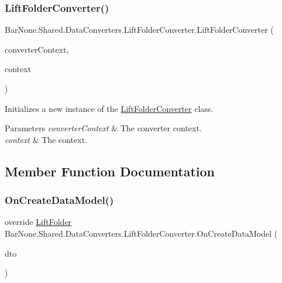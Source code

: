 \subsubsection{\texorpdfstring{Lift\+Folder\+Converter()}{LiftFolderConverter()}}
{\footnotesize\ttfamily Bar\+None.\+Shared.\+Data\+Converters.\+Lift\+Folder\+Converter.\+Lift\+Folder\+Converter (\begin{DoxyParamCaption}\item[{\mbox{\hyperlink{class_bar_none_1_1_shared_1_1_data_converters_1_1_converters}{Converters}}}]{converter\+Context,  }\item[{\mbox{\hyperlink{interface_bar_none_1_1_shared_1_1_core_1_1_i_domain_context}{I\+Domain\+Context}}}]{context }\end{DoxyParamCaption})}



Initializes a new instance of the \mbox{\hyperlink{class_bar_none_1_1_shared_1_1_data_converters_1_1_lift_folder_converter}{Lift\+Folder\+Converter}} class. 


\begin{DoxyParams}{Parameters}
{\em converter\+Context} & The converter context.\\
\hline
{\em context} & The context.\\
\hline
\end{DoxyParams}


\subsection{Member Function Documentation}
\mbox{\label{class_bar_none_1_1_shared_1_1_data_converters_1_1_lift_folder_converter_aeb15c1339f51dd7d84c4b10d6287f4af}} 
\subsubsection{\texorpdfstring{On\+Create\+Data\+Model()}{OnCreateDataModel()}}
{\footnotesize\ttfamily override \mbox{\hyperlink{class_bar_none_1_1_shared_1_1_domain_model_1_1_lift_folder}{Lift\+Folder}} Bar\+None.\+Shared.\+Data\+Converters.\+Lift\+Folder\+Converter.\+On\+Create\+Data\+Model (\begin{DoxyParamCaption}\item[{\mbox{\hyperlink{class_bar_none_1_1_shared_1_1_data_transfer_1_1_lift_folder_d_t_o}{Lift\+Folder\+D\+TO}}}]{dto }\end{DoxyParamCaption})}



